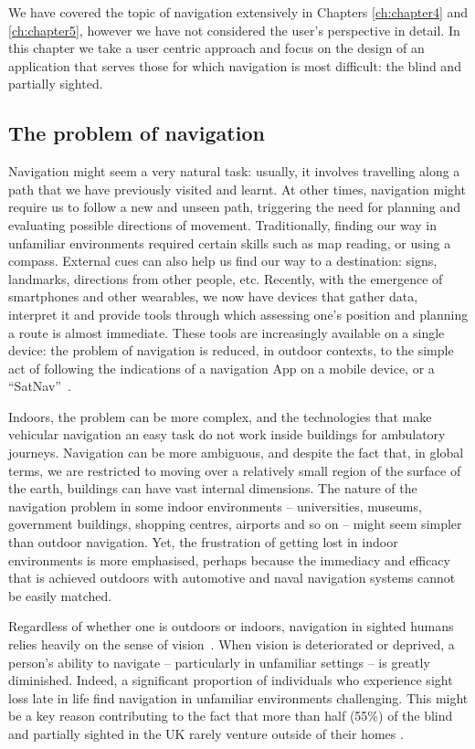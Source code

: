 We have covered the topic of navigation extensively in Chapters \ref{ch:chapter4} and \ref{ch:chapter5}, however we have not considered the user's perspective in detail. In this chapter we take a user centric approach and focus on the design of an application that serves those for which navigation is most difficult: the blind and partially sighted.

\subsection{The problem of navigation}

Navigation might seem a very natural task: usually, it involves travelling along a path that we have previously visited and learnt. At other times, navigation might require us to follow a new and unseen path, triggering the need for planning and evaluating possible directions of movement. Traditionally, finding our way in unfamiliar environments required certain skills such as map reading, or using a compass. External cues can also help us find our way to a destination: signs, landmarks, directions from other people, etc. Recently, with the emergence of smartphones and other wearables, we now have devices that gather data, interpret it and provide tools through which assessing one's position and planning a route is almost immediate. These tools are increasingly available on a single device: the problem of navigation is reduced, in outdoor contexts, to the simple act of following the indications of a navigation App on a mobile device, or a ``SatNav''~\citep{spirkovska2005summary}.


Indoors, the problem can be more complex, and the technologies that make vehicular navigation an easy task do not work inside buildings for ambulatory journeys. Navigation can be more ambiguous, and despite the fact that, in global terms, we are restricted to moving over a relatively small region of the surface of the earth, buildings can have vast internal dimensions.  The nature of the navigation problem in some indoor environments -- universities, museums, government buildings, shopping centres, airports and so on -- might seem simpler than outdoor navigation. Yet, the frustration of getting lost in indoor environments is more emphasised, perhaps because the immediacy and efficacy that is achieved outdoors with automotive and naval navigation systems cannot be easily matched.
 
Regardless of whether one is outdoors or indoors, navigation in sighted humans relies heavily on the sense of vision~\citep{kalia2008learning,tsuji2005landmarks}. When vision is deteriorated or deprived, a person's ability to navigate -- particularly in unfamiliar settings -- is greatly diminished. Indeed, a significant proportion of individuals who experience sight loss late in life find navigation in unfamiliar environments challenging. This might be a key reason contributing to the fact that more than half (55\%) of the blind and partially sighted in the UK rarely venture outside of their homes \citep{Worsfold2010}.

